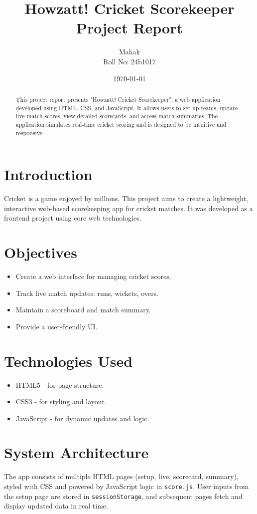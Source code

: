 \documentclass[12pt]{article}
\title{Howzatt! Cricket Scorekeeper\\\large Project Report}
\author{Mahak\\Roll No: 24b1017}
\date{\today}
\begin{document}
\maketitle
\begin{abstract}
This project report presents "Howzatt! Cricket Scorekeeper", a web application developed using HTML, CSS, and JavaScript. It allows users to set up teams, update live match scores, view detailed scorecards, and access match summaries. The application simulates real-time cricket scoring and is designed to be intuitive and responsive.
\end{abstract}

\tableofcontents
\newpage

\section{Introduction}
Cricket is a game enjoyed by millions. This project aims to create a lightweight, interactive web-based scorekeeping app for cricket matches. It was developed as a frontend project using core web technologies.

\section{Objectives}
\begin{itemize}
    \item Create a web interface for managing cricket scores.
    \item Track live match updates: runs, wickets, overs.
    \item Maintain a scoreboard and match summary.
    \item Provide a user-friendly UI.
\end{itemize}

\section{Technologies Used}
\begin{itemize}
    \item HTML5 - for page structure.
    \item CSS3 - for styling and layout.
    \item JavaScript - for dynamic updates and logic.
\end{itemize}

\section{System Architecture}
The app consists of multiple HTML pages (setup, live, scorecard, summary), styled with CSS and powered by JavaScript logic in \texttt{score.js}. User inputs from the setup page are stored in \texttt{sessionStorage}, and subsequent pages fetch and display updated data in real time.
\end{document}
